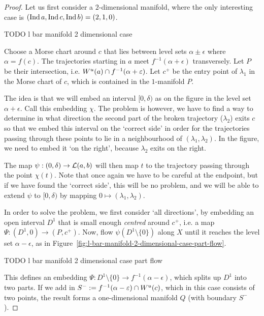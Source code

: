 \begin{proof}
    Let us first consider a $2$-dimensional manifold, where the only interesting case is $(\operatorname{Ind} a, \operatorname{Ind} c, \operatorname{Ind} b) = (2,1,0)$.

    \begin{marginfigure}
        \centering
        \caption{TODO l bar manifold 2 dimensional case}
        \label{fig:l-bar-manifold-2-dimensional-case}
    \end{marginfigure}
    Choose a Morse chart around $c$ that lies between level sets $\alpha \pm \epsilon$ where  $\alpha = f(c)$.
    The trajectories starting in $a$ meet $f^{-1}(\alpha + \epsilon)$ transversely.
    Let $P$ be their intersection, i.e. $W^u(a) \cap  f^{-1}( \alpha + \varepsilon)$.
    Let $c^{+}$ be the entry point of $\lambda_1$ in  the Morse chart of $c$, which is contained in the $1$-manifold $P$.

    The idea is that we will embed an interval $[0, \delta)$ as on the figure in the level set $\alpha + \epsilon$. Call this embedding $\chi$.
    The problem is however, we have to find a way to determine in what direction the second part of the broken trajectory ($\lambda_2$) exits $c$ so that we embed this interval on the `correct side' in order for the trajectories passing through these points to lie in a neighbourhood of $(\lambda_1, \lambda_2)$.
    In the figure, we need to embed it `on the right', because $\lambda_2$ exits on the right.

    The map $\psi:(0, \delta) \to  \mathcal L(a, b)$ will then map $t$ to the trajectory passing through the point $\chi(t)$.
    Note that once again we have to be careful at the endpoint, but if we have found the `correct side', this will be no problem, and we will be able to extend $\psi$ to $[0, \delta)$ by mapping  $0 \mapsto (\lambda_1, \lambda_2)$.

    In order to solve the problem, we first consider `all directions', by embedding an open interval $D^{1}$ that is small enough \emph{centred} around $c^{+}$, i.e. a map $\Psi: (D^{1}, 0) \to  (P, c^{+})$.
    Now, flow $\psi(D^{1} \setminus \{0\} )$ along $X$ until it reaches the level set $\alpha - \epsilon$, as in Figure~\ref{fig:l-bar-manifold-2-dimensional-case-part-flow}.
    \begin{marginfigure}
        \centering
        \caption{TODO l bar manifold 2 dimensional case part flow}
        \label{fig:l-bar-manifold-2-dimensional-case-part-flow}
    \end{marginfigure}
    This defines an embedding $\Psi: D^{1} \setminus \{0\} \to  f^{-1}(\alpha-\epsilon)$, which splits up $D^{1}$ into two parts.
    If we add in $S^{-} := f^{-1}(\alpha-\varepsilon) \cap W^u(c)$, which in this case consists of two points, the result forms a one-dimensional manifold $Q$ (with boundary $S^{-}$).


\end{proof}

